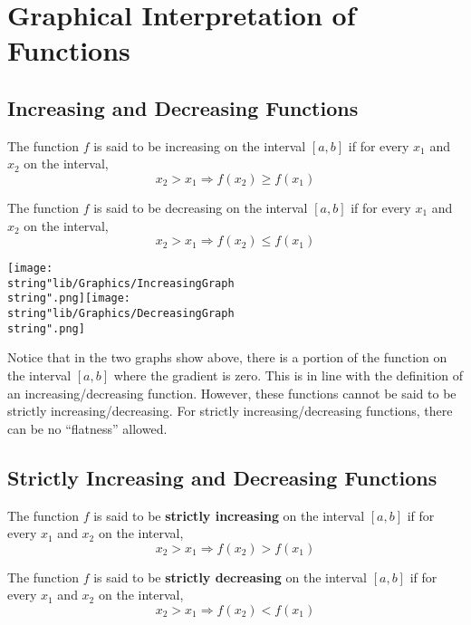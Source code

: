 \documentclass[11pt,a4paper]{book}
\begin{document}
\section{Graphical Interpretation of Functions}

\subsection{Increasing and Decreasing Functions}

\begin{tcolorbox}[colback=blue!5, colframe=black, boxrule=.4pt, sharpish corners]

The function $f$ is said to be increasing on the interval $\left[a,b\right]$
if for every $x_{1}$ and $x_{2}$ on the interval,
\[
x_{2}>x_{1}\Rightarrow f\left(x_{2}\right)\geq f\left(x_{1}\right)
\]

The function $f$ is said to be decreasing on the interval $\left[a,b\right]$
if for every $x_{1}$ and $x_{2}$ on the interval,
\[
x_{2}>x_{1}\Rightarrow f\left(x_{2}\right)\leq f\left(x_{1}\right)
\]
\end{tcolorbox}

\begin{center}
\texttt{[image: \\string"lib/Graphics/IncreasingGraph\\string".png]}\hspace{1cm}\texttt{[image: \\string"lib/Graphics/DecreasingGraph\\string".png]}
\par\end{center}

Notice that in the two graphs show above, there is a portion of the
function on the interval $\left[a,b\right]$ where the gradient is
zero. This is in line with the definition of an increasing/decreasing
function. However, these functions cannot be said to be strictly increasing/decreasing.
For strictly increasing/decreasing functions, there can be no ``flatness''
allowed.

\subsection{Strictly Increasing and Decreasing Functions}

\begin{tcolorbox}[colback=blue!5, colframe=black, boxrule=.4pt, sharpish corners]

The function $f$ is said to be \textbf{strictly increasing} on the
interval $\left[a,b\right]$ if for every $x_{1}$ and $x_{2}$ on
the interval,
\[
x_{2}>x_{1}\Rightarrow f\left(x_{2}\right)>f\left(x_{1}\right)
\]

The function $f$ is said to be \textbf{strictly decreasing} on the
interval $\left[a,b\right]$ if for every $x_{1}$ and $x_{2}$ on
the interval,
\[
x_{2}>x_{1}\Rightarrow f\left(x_{2}\right)<f\left(x_{1}\right)
\]
\end{tcolorbox}
\end{document}
